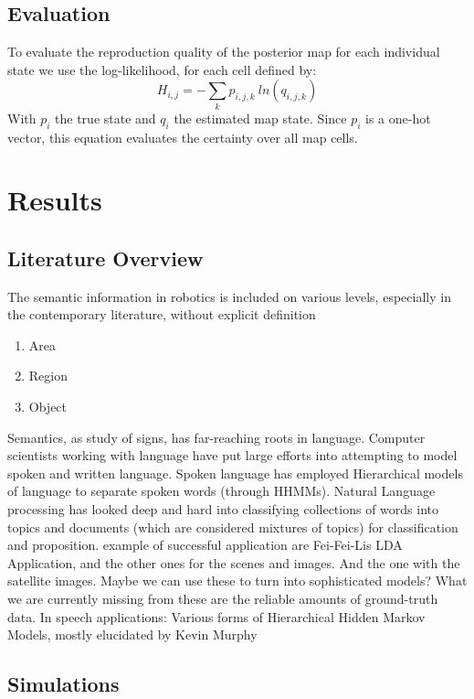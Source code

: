 \documentclass[twocolumn,letterpaper]{IEEEAerospaceCLS}  %
\begin{document}
\subsection{Evaluation}\label{subsec:MetEval}
To evaluate the reproduction quality of the posterior map for each individual state we use the log-likelihood, for each cell defined by:
\begin{equation}
    H_{i,j} = - \sum_{k} p_{i,j,k}~ln(q_{i,j,k})
\end{equation}
With $p_i$ the true state and $q_i$ the estimated map state. Since $p_i$ is a one-hot vector, this equation evaluates the certainty over all map cells.
\section{Results} \label{sec:Results}
\subsection{Literature Overview}
The semantic information in robotics is included on various levels, especially in the contemporary literature, without explicit definition
\begin{enumerate}
    \item Area
    \item Region
    \item Object
\end{enumerate}
Semantics, as study of signs, has far-reaching roots in language. Computer scientists working with language have put large efforts into attempting to model spoken and written language. Spoken language has employed Hierarchical models of language to separate spoken words (through HHMMs). Natural Language processing has looked deep and hard into classifying collections of words into topics and documents (which are considered mixtures of topics) for classification and proposition. 
example of successful application are Fei-Fei-Lis LDA Application, and the other ones for the scenes and images. And the one with the satellite images. Maybe we can use these to turn into sophisticated models?
What we are currently missing from these are the reliable amounts of ground-truth data.
In speech applications: Various forms of Hierarchical Hidden Markov Models, mostly elucidated by Kevin Murphy~\cite{murphy_dynamic_2002}
\subsection{Simulations}
\end{document}
